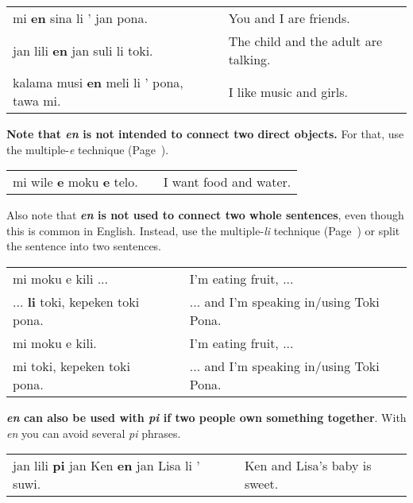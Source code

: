 \begin{supertabular}{p{5,5cm}|ll}
mi \textbf{en} sina li ' jan pona. && You and I are friends. \\
jan lili \textbf{en} jan suli li toki. && The child and the adult are talking. \\
kalama musi \textbf{en} meli li ' pona, tawa mi. && I like music and girls. \\
\end{supertabular} 

\textbf{Note that \textit{en} is not intended to connect two direct objects.} 
For that, use the multiple-\textit{e} technique (Page~\pageref{'multiple_e'}). 

\begin{supertabular}{p{5,5cm}|ll}
mi wile \textbf{e} moku \textbf{e} telo. && I want food and water. \\
\end{supertabular} 

Also note that \textbf{\textit{en} is not used to connect two whole sentences}, even though this is common in English. 
Instead, use the multiple-\textit{li} technique  (Page~\pageref{'multiple_li'}) or split the sentence into two sentences. 

\begin{supertabular}{p{5,5cm}|ll}
mi moku e kili ... && I'm eating fruit, ... \\ %
... \textbf{li} toki, kepeken toki pona.  && ... and I'm speaking in/using Toki Pona. \\ %
mi moku e kili.  && I'm eating fruit, ... \\ %
mi toki, kepeken toki pona. && ... and I'm speaking in/using Toki Pona. \\ %
\end{supertabular} 

\textbf{\textit{en} can also be used with \textit{pi} if two people own something together}. 
With \textit{en} you can avoid several \textit{pi} phrases.

\begin{supertabular}{p{5,5cm}|ll}
jan lili \textbf{pi} jan Ken \textbf{en} jan Lisa li ' suwi. && Ken and Lisa's baby is sweet. \\
\end{supertabular} 
%
